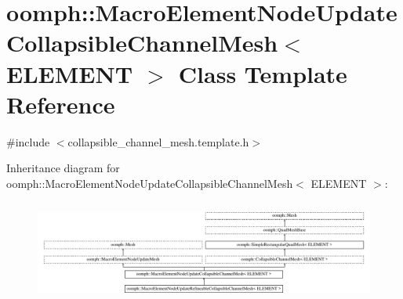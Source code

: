 \hypertarget{classoomph_1_1MacroElementNodeUpdateCollapsibleChannelMesh}{}\section{oomph\+:\+:Macro\+Element\+Node\+Update\+Collapsible\+Channel\+Mesh$<$ E\+L\+E\+M\+E\+NT $>$ Class Template Reference}
\label{classoomph_1_1MacroElementNodeUpdateCollapsibleChannelMesh}


{\ttfamily \#include $<$collapsible\+\_\+channel\+\_\+mesh.\+template.\+h$>$}

Inheritance diagram for oomph\+:\+:Macro\+Element\+Node\+Update\+Collapsible\+Channel\+Mesh$<$ E\+L\+E\+M\+E\+NT $>$\+:\begin{figure}[H]
\begin{center}
\leavevmode
\includegraphics[height=3.393939cm]{classoomph_1_1MacroElementNodeUpdateCollapsibleChannelMesh}
\end{center}
\end{figure}
